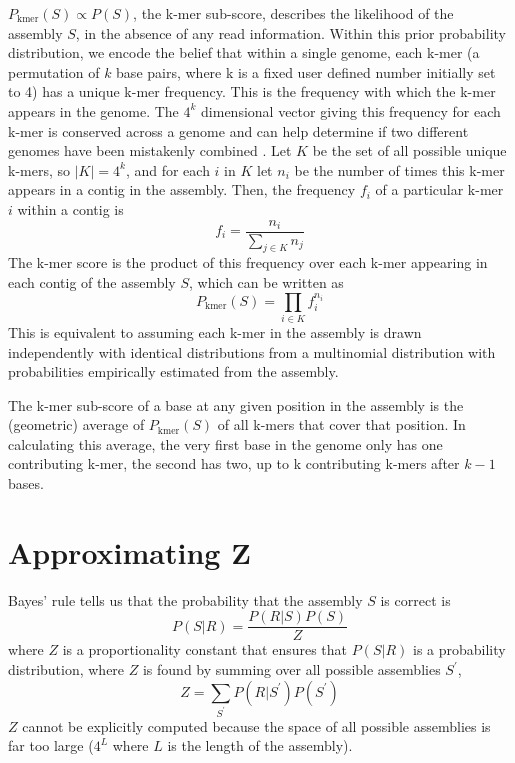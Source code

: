 \documentclass[phd,tocprelim]{cornell}
\begin{document}
$P_{\text{kmer}}(S) \propto P(S)$, the k-mer sub-score, describes the likelihood of the assembly $S$, in the absence of any read information.  Within this prior probability distribution, we encode the belief that within a single genome, each k-mer (a permutation of $k$ base pairs, where k is a fixed user defined number initially set to 4) has a unique k-mer frequency. This is the frequency with which the k-mer appears in the genome.  The $4^{k}$ dimensional vector giving this frequency for each k-mer is conserved across a genome and can help determine if two different genomes have been mistakenly combined \cite{Teeling2004} \cite{Woyke2006}. Let $K$ be the set of all possible unique k-mers, so $|K| = 4^{k}$, and for each $i$ in $K$ let $n_{i}$ be the number of times this k-mer appears in a contig in the assembly. Then, the frequency $f_{i}$ of a particular k-mer $i$ within a contig is
\begin{equation}
    f_{i} = \frac{n_{i}}{\sum_{j\in K}n_{j}}
\end{equation}
The k-mer score is the product of this frequency over each k-mer appearing in each contig of the assembly $S$, which can be written as
\begin{equation}
    P_{\text{kmer}}(S) = \prod_{i\in K} f_{i}^{n_{i}}
\end{equation}
This is equivalent to assuming each k-mer in the assembly is drawn independently with identical distributions from a multinomial distribution with probabilities empirically estimated from the assembly.

The k-mer sub-score of a base at any given position in the assembly is the (geometric) average of $P_{\text{kmer}}(S)$ of all k-mers that cover that position. In calculating this average, the very first base in the genome only has one contributing k-mer, the second has two, up to k contributing k-mers after $k-1$ bases.



\section{Approximating Z} %
\label{sec:ApproxZ}

Bayes' rule tells us that the probability that the assembly $S$ is correct is
\begin{equation}
    P(S|R) = \frac{P(R|S)P(S)}{Z}
\end{equation}
where $Z$ is a proportionality constant that ensures that $P(S|R)$ is a probability distribution, where $Z$ is found by summing over all possible assemblies $S^{\prime}$,
\begin{equation}
    Z = \sum_{S^{\prime}}P(R|S^{\prime})P(S^{\prime})
\end{equation}
$Z$ cannot be explicitly computed because the space of all possible assemblies is far too large ($4^{L}$ where $L$ is the length of the assembly). 
\end{document}
